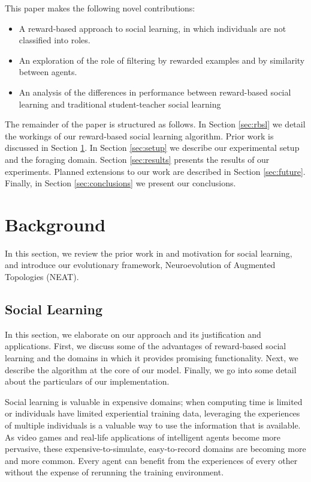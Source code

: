 \documentclass{acm_proc_article-sp}
\begin{document}
This paper makes the following novel contributions:
 
\begin{itemize}
\item A reward-based approach to social learning, in which individuals are not classified into roles.
\item An exploration of the role of filtering by rewarded examples and by similarity between agents.
\item An analysis of the differences in performance between reward-based social learning and traditional student-teacher social learning
\end{itemize}
 
The remainder of the paper is structured as follows.
In Section \ref{sec:rbsl} we detail the workings of our reward-based social learning algorithm.
Prior work is discussed in Section \ref{sec:background}.
In Section \ref{sec:setup} we describe our experimental setup and the foraging domain.
Section \ref{sec:results} presents the results of our experiments.
Planned extensions to our work are described in Section \ref{sec:future}. Finally, in Section \ref{sec:conclusions} we present our conclusions.

\section{Background}
\label{sec:background}
In this section, we review the prior work in and motivation for social learning, and introduce our evolutionary framework, Neuroevolution of Augmented Topologies (NEAT).

\subsection*{Social Learning}

In this section, we elaborate on our approach and its justification and applications. First, we discuss some of the advantages of reward-based social learning and the domains in which it provides promising functionality. Next, we describe the algorithm at the core of our model. Finally, we go into some detail about the particulars of our implementation.

Social learning is valuable in expensive domains; when computing time is limited or individuals have limited experiential training data, leveraging the experiences of multiple individuals is a valuable way to use the information that is available. As video games and real-life applications of intelligent agents become more pervasive, these expensive-to-simulate, easy-to-record domains are becoming more and more common. Every agent can benefit from the experiences of every other without the expense of rerunning the training environment.
\end{document}
